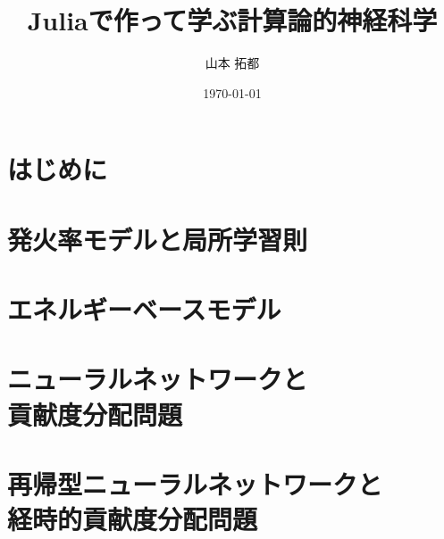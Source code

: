 \documentclass[titlepage]{ltjsbook}
\title{\Huge \textbf{Juliaで作って学ぶ計算論的神経科学}}
\author{\huge 山本 拓都}
\date{\huge \today}
\begin{document}
\maketitle

\setcounter{tocdepth}{2}
\tableofcontents
\clearpage
\chapter{はじめに}


\chapter{発火率モデルと局所学習則}
%
% 
% 

\chapter{エネルギーベースモデル}
\chapter[ニューラルネットワークと貢献度分配問題]{ニューラルネットワークと\\貢献度分配問題}
\chapter[再帰型ニューラルネットワークと経時的貢献度分配問題]{再帰型ニューラルネットワークと\\経時的貢献度分配問題}
\end{document}
